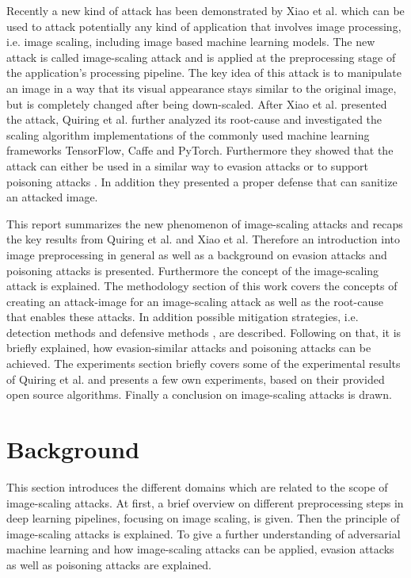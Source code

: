 \documentclass[sigconf]{acmart}
\begin{document}
Recently a new kind of attack has been demonstrated by Xiao et al.\cite{camouflage} which can be used to attack potentially any kind of application that involves image processing, i.e. image scaling, including image based machine learning models.
The new attack is called image-scaling attack and is applied at the preprocessing stage of the application's processing pipeline.
The key idea of this attack is to manipulate an image in a way that its visual appearance stays similar to the original image, but is completely changed after being down-scaled.
After Xiao et al. presented the attack, Quiring et al. further analyzed its root-cause and investigated the scaling algorithm implementations of the commonly used machine learning frameworks TensorFlow, Caffe and PyTorch.
Furthermore they showed that the attack can either be used in a similar way to evasion attacks or to support poisoning attacks \cite{imgscale, imgscalepoison}.
In addition they presented a proper defense that can sanitize an attacked image.

This report summarizes the new phenomenon of image-scaling attacks and recaps the key results from Quiring et al. and Xiao et al. 
Therefore an introduction into image preprocessing in general as well as a background on evasion attacks and poisoning attacks is presented.
Furthermore the concept of the image-scaling attack is explained.
The methodology section of this work covers the concepts of creating an attack-image for an image-scaling attack as well as the root-cause that enables these attacks.
In addition possible mitigation strategies, i.e. detection methods \cite{camouflage} and defensive methods \cite{imgscale}, are described.
Following on that, it is briefly explained, how evasion-similar attacks and poisoning attacks can be achieved.
The experiments section briefly covers some of the experimental results of Quiring et al. and presents a few own experiments, based on their provided open source algorithms.
Finally a conclusion on image-scaling attacks is drawn.

\section{Background}
This section introduces the different domains which are related to the scope of image-scaling attacks.
At first, a brief overview on different preprocessing steps in deep learning pipelines, focusing on image scaling, is given.
Then the principle of image-scaling attacks is explained.
To give a further understanding of adversarial machine learning and how image-scaling attacks can be applied, evasion attacks as well as poisoning attacks are explained.
\end{document}
